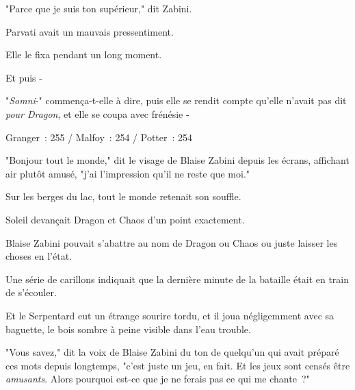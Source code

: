"Parce que je suis ton supérieur," dit Zabini.

Parvati avait un mauvais pressentiment.

Elle le fixa pendant un long moment.

Et puis -

"\emph{Somni}-" commença-t-elle à dire, puis elle se rendit compte qu'elle n'avait pas dit \emph{pour Dragon}, et elle se coupa avec frénésie -

\later

Granger~: 255 / Malfoy~: 254 / Potter~: 254

"Bonjour tout le monde," dit le visage de Blaise Zabini depuis les écrans, affichant air plutôt amusé, "j'ai l'impression qu'il ne reste que moi."

Sur les berges du lac, tout le monde retenait son souffle.

Soleil devançait Dragon et Chaos d'un point exactement.

Blaise Zabini pouvait s'abattre au nom de Dragon ou Chaos ou juste laisser les choses en l'état.

Une série de carillons indiquait que la dernière minute de la bataille était en train de s'écouler.

Et le Serpentard eut un étrange sourire tordu, et il joua négligemment avec sa baguette, le bois sombre à peine visible dans l'eau trouble.

"Vous savez," dit la voix de Blaise Zabini du ton de quelqu'un qui avait préparé ces mots depuis longtemps, "c'est juste un jeu, en fait. Et les jeux sont censés être \emph{amusants}. Alors pourquoi est-ce que je ne ferais pas ce qui me chante~?"~ 

